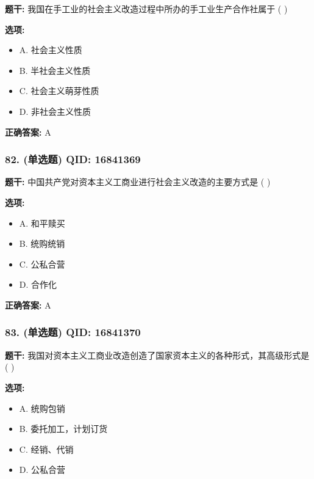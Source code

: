 \documentclass[12pt,UTF8]{ctexart}
\begin{document}
\textbf{题干:}
我国在手工业的社会主义改造过程中所办的手工业生产合作社属于 ( )

\textbf{选项:}
\begin{itemize}[leftmargin=*]

  \item A. 社会主义性质

  \item B. 半社会主义性质

  \item C. 社会主义萌芽性质

  \item D. 非社会主义性质

\end{itemize}

\textbf{正确答案:}
A

\vspace{0.3em}\hrulefill\vspace{0.7em}

\subsubsection*{82. (单选题) \small QID: 16841369}

\textbf{题干:}
中国共产党对资本主义工商业进行社会主义改造的主要方式是 ( )

\textbf{选项:}
\begin{itemize}[leftmargin=*]

  \item A. 和平赎买

  \item B. 统购统销

  \item C. 公私合营

  \item D. 合作化

\end{itemize}

\textbf{正确答案:}
A

\vspace{0.3em}\hrulefill\vspace{0.7em}

\subsubsection*{83. (单选题) \small QID: 16841370}

\textbf{题干:}
我国对资本主义工商业改造创造了国家资本主义的各种形式，其高级形式是 ( )

\textbf{选项:}
\begin{itemize}[leftmargin=*]

  \item A. 统购包销

  \item B. 委托加工，计划订货

  \item C. 经销、代销

  \item D. 公私合营

\end{itemize}
\end{document}
